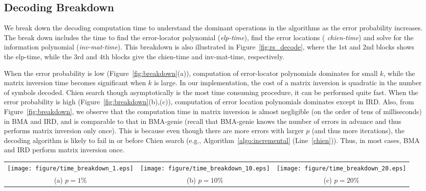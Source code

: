 \documentclass[10pt,journal,letterpaper,compsoc]{IEEEtran}
\newcommand{\0}{{\bf 0}}
\begin{document}
\subsection{Decoding Breakdown}
We break down the decoding computation time to understand the dominant operations in the algorithms 
as the error probability increases. The break down includes the time 
to find the error-locator polynomial ({\it elp-time}), find the error locations ({\it
chien-time}) and solve for the information polynomial ({\it inv-mat-time}). This
breakdown is also illustrated in
Figure~\ref{fig:rs_decode}, where the $1$st and $2$nd blocks shows the elp-time, while the $3$rd
and $4$th blocks give the chien-time and inv-mat-time, respectively. 

When the error probability is low (Figure~\ref{fig:breakdown}(a)), computation
of error-locator polynomials dominates for small $k$, while the
matrix inversion time becomes significant when $k$ is large. In our
implementation, the cost of a matrix inversion is quadratic in the number of
symbols decoded. Chien search though asymptotically is the most time consuming
procedure, it can be performed quite fast. When the error
probability is high (Figure~\ref{fig:breakdown}(b),(c)), computation of error location polynomials
dominates except in IRD. Also, from Figure~\ref{fig:breakdown},
we observe that the computation time in matrix inversion is almost
negligible (on the order of tens of milliseconds) in BMA and IRD, and
is comparable to that in BMA-genie (recall that BMA-genie knows the number of
errors in advance and thus performs matrix inversion only once). This is
because even though there are more errors with larger $p$ (and thus more
iterations), the decoding algorithm is likely to fail in or before Chien search
(e.g., Algorithm~\ref{algo:incremental} (Line~\ref{chien})). Thus, in most
cases, BMA and IRD perform matrix inversion once.

\begin{figure*}[thp]
\begin{center}
\begin{tabular}{ccc}
\texttt{[image: figure/time\_breakdown\_1.eps]} &
\texttt{[image: figure/time\_breakdown\_10.eps]} &
\texttt{[image: figure/time\_breakdown\_20.eps]} \\
(a) $p = 1\%$ &
(b) $p =10\%$ &
(c) $p = 20\%$ 
\end{tabular}
\caption{Average computational time breakdown for decoding one $(1023,k)-$MDS codeword,
$k\in\{101,401\}$. Because IRD progressively decodes, its performance
does not deteriorate with an increasing Byzantine node rate, $p$.}
\label{fig:breakdown}
\end{center}
\end{figure*}
\end{document}
